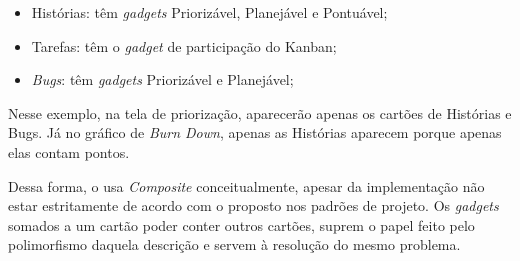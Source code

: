 \begin{itemize}
	\item{Histórias: têm \textit{gadgets} Priorizável, Planejável e Pontuável;}
	\item{Tarefas: têm o \textit{gadget} de participação do Kanban;}
	\item{\textit{Bugs}: têm \textit{gadgets} Priorizável e Planejável;}
\end{itemize}

Nesse exemplo, na tela de priorização, aparecerão apenas os cartões de Histórias e Bugs. Já no gráfico de \textit{Burn Down}, apenas as Histórias aparecem porque apenas elas contam pontos.

Dessa forma, o \calopsita{} usa \textit{Composite} conceitualmente, apesar da implementação não estar estritamente de acordo com o proposto nos padrões de projeto. Os \textit{gadgets} somados a um cartão poder conter outros cartões, suprem o papel feito pelo polimorfismo daquela descrição e servem à resolução do mesmo problema. 
